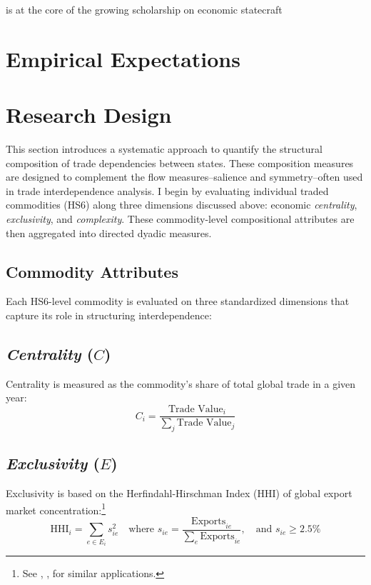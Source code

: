 \documentclass[12pt]{article}
\begin{document}
is at the core of the growing scholarship on economic statecraft \parencite{aggarwal2025oxford, blackwill2016war, chen2023wars, ferguson2025states, katada2022east}

\section{Empirical Expectations}
\section{Research Design}
This section introduces a systematic approach to quantify the structural composition of trade dependencies between states. These composition measures are designed to complement the flow measures--salience and symmetry--often used in trade interdependence analysis. I begin by evaluating individual traded commodities (HS6) along three dimensions discussed above: economic \textit{centrality}, \textit{exclusivity}, and \textit{complexity}. These commodity-level compositional attributes are then aggregated into directed dyadic measures.

\subsection{Commodity Attributes}
Each HS6-level commodity is evaluated on three standardized dimensions that capture its role in structuring interdependence:

\subsection*{\textit{Centrality} ($C$)}
Centrality is measured as the commodity's share of total global trade in a given year: 
\begin{equation}
C_i = \frac{\text{Trade Value}_i}{\sum_{j} \text{Trade Value}_j}
\end{equation}

\subsection*{\textit{Exclusivity} ($E$)}

Exclusivity is based on the Herfindahl-Hirschman Index (HHI) of global export market concentration:\footnote{See \textcite{goenner2010toys}, \textcite{arriola2024}, \textcite{chimits2024} for similar applications.}
\begin{equation}
\text{HHI}_i = \sum_{e \in E_i} s_{ie}^2 \quad \text{where } s_{ie} = \frac{\text{Exports}_{ie}}{\sum_{e} \text{Exports}_{ie}}, \quad \text{and } s_{ie} \geq 2.5\%
\end{equation}
\end{document}
